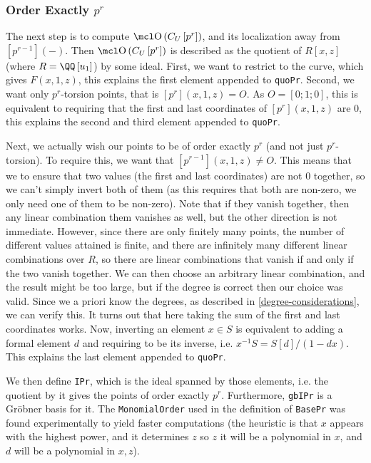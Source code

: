 \subsubsection{Order Exactly $p^r$}

The next step is to compute $\OO\left(C_U\left[p^r\right]\right)$, and its localization away from $[p^{r-1}]\left(-\right)$.
Then $\OO\left(C_U\left[p^r\right]\right)$ is described as the quotient of $R\left[x, z\right]$ (where $R = \QQ\left[u_1\right]$) by some ideal.
First, we want to restrict to the curve, which gives $F\left(x,1,z\right)$, this explains the first element appended to \texttt{quoPr}.
Second, we want only $p^r$-torsion points, that is $\left[p^r\right]\left(x,1,z\right) = O$.
As $O = \left[0;1;0\right]$, this is equivalent to requiring that the first and last coordinates of $\left[p^r\right]\left(x,1,z\right)$ are $0$, this explains the second and third element appended to \texttt{quoPr}.

Next, we actually wish our points to be of order exactly $p^r$ (and not just $p^r$-torsion).
To require this, we want that $\left[p^{r-1}\right]\left(x,1,z\right) \neq O$.
This means that we to ensure that two values (the first and last coordinates) are not $0$ together, so we can't simply invert both of them (as this requires that both are non-zero, we only need one of them to be non-zero).
Note that if they vanish together, then any linear combination them vanishes as well, but the other direction is not immediate.
However, since there are only finitely many points, the number of different values attained is finite, and there are infinitely many different linear combinations over $R$, so there are linear combinations that vanish if and only if the two vanish together.
We can then choose an arbitrary linear combination, and the result might be too large, but if the degree is correct then our choice was valid.
Since we a priori know the degrees, as described in \ref{degree-considerations}, we can verify this.
It turns out that here taking the sum of the first and last coordinates works.
Now, inverting an element $x \in S$ is equivalent to adding a formal element $d$ and requiring to be its inverse, i.e. $x^{-1} S = S\left[d\right]/(1 - dx)$.
This explains the last element appended to \texttt{quoPr}.

We then define \texttt{IPr}, which is the ideal spanned by those elements, i.e. the quotient by it gives the points of order exactly $p^r$.
Furthermore, \texttt{gbIPr} is a Gr\"{o}bner basis for it.
The \texttt{MonomialOrder} used in the definition of \texttt{BasePr} was found experimentally to yield faster computations (the heuristic is that $x$ appears with the highest power, and it determines $z$ so $z$ it will be a polynomial in $x$, and $d$ will be a polynomial in $x,z$).

